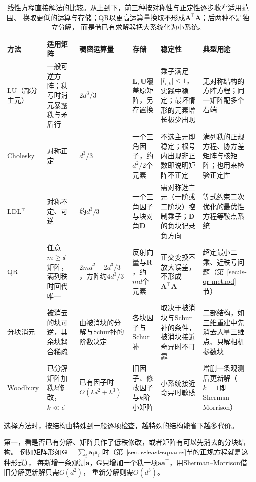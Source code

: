 \begin{table}[htbp]
 \centering\small
 \begin{tabularx}{\linewidth}{@{}l>{\raggedright\arraybackslash}X>{\raggedright\arraybackslash}p{24mm}>{\raggedright\arraybackslash}X>{\raggedright\arraybackslash}X>{\raggedright\arraybackslash}X@{}}
  \toprule
  方法 & 适用矩阵 & 稠密运算量 & 存储 & 稳定性 & 典型用途\\
  \midrule
  LU（部分主元） & 一般可逆方阵；秩亏时消元暴露秩与矛盾行 & $2d^3/3$ & $\bm L,\bm U$覆盖原矩阵，另存置换 & 乘子满足$\lvert l_{i,k}\rvert\leq1$，实践中稳定；最坏情形的元素增长极少出现 & 无对称结构的方阵方程；同一矩阵配多个右端\\
  Cholesky & 对称正定 & $d^3/3$ & 一个三角因子，约$d^2/2$个元素 & 不选主元即稳定；根号内出现非正数即说明矩阵不正定 & 满列秩的正规方程、协方差矩阵与核矩阵；也用来检验正定性\\
  LDL$^{\top}$ & 对称不定、可逆 & 约$d^3/3$ & 一个三角因子与块对角$\bm D$ & 需对称选主元（一阶或二阶块）控制乘子；$\bm D$的负块记录负方向 & 等式约束二次优化的最优性方程等鞍点系统\\
  QR & 任意$m\geq d$矩阵，满列秩时回代唯一 & $2md^2-2d^3/3$，方阵约$4d^3/3$ & 反射向量与$\bm R$，约$md$个元素 & 正交变换不放大误差，不形成$\bm A^\top\bm A$ & 超定最小二乘、近秩亏问题（第~\ref{sec:ls-qr-method}节）\\
  分块消元 & 被消去的块可逆，其余块耦合稀疏 & 由被消块的分解与Schur补的阶数决定 & 各块因子与Schur补 & 取决于被消块与Schur补的条件，被消块接近奇异时不可靠 & 二部结构，如三维重建中先消去大量三维点、只解相机参数块\\
  Woodbury & 已分解矩阵加秩$k$修改，$k\ll d$ & 已有因子时$O(kd^2+k^3)$ & 旧因子、修改因子与$k$阶小矩阵 & 小系统接近奇异时敏感 & 增删一条观测后更新解（$k=1$即Sherman--Morrison）\\
  \bottomrule
 \end{tabularx}
 \caption{线性方程直接解法的比较。从上到下，前三种按对称性与正定性逐步收窄适用范围、
 换取更低的运算与存储；QR以更高运算量换取不形成$\bm A^\top\bm A$；后两种不是独立分解，
 而是借已有求解器把大系统化为小系统。}
 \label{tab:ls-direct-method-comparison}
\end{table}

选择方法时，按结构由特殊到一般逐项检查，越特殊的结构能省下越多代价。

第一，看是否已有分解、矩阵只作了低秩修改，或者矩阵有可以先消去的分块结构。
例如矩阵形如$\bm G=\sum_i\bm a_i\bm a_i^\top$时（第~\ref{sec:ls-least-squares}节的正规方程就是这种形式），
每新增一条观测$\bm a$，$\bm G$只增加一个秩一项$\bm a\bm a^\top$，用Sherman--Morrison借旧分解更新解只需$O(d^2)$，
重新分解则需$O(d^3)$。

